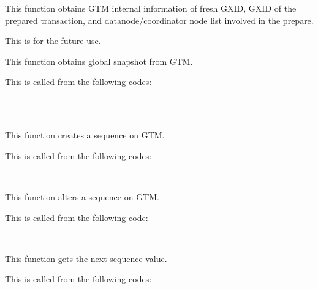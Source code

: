   
      This function obtains GTM internal information of fresh GXID, GXID of the prepared
	  transaction, and datanode/coordinator node list involved in the prepare.
      
      This is for the future use.
  
  
      This function obtains global snapshot from GTM.
      
      This is called from the following codes:
      
      \FuncRefHdr
		  \\
		  \\ \hline
      \FuncRefTrailor
  
  
      This function creates a sequence on GTM.
      
      This is called from the following codes:
      
      \FuncRefHdr
		  \\ \hline
      \FuncRefTrailor
  
  
      This function alters a sequence on GTM.
      
      This is called from the following code:
      
      \FuncRefHdr
		  \\ \hline
      \FuncRefTrailor
  
  
      This function gets the next sequence value.
      
      This is called from the following codes:
      
      \FuncRefHdr
      \\ \hline
      \FuncRefTrailor
  
  
